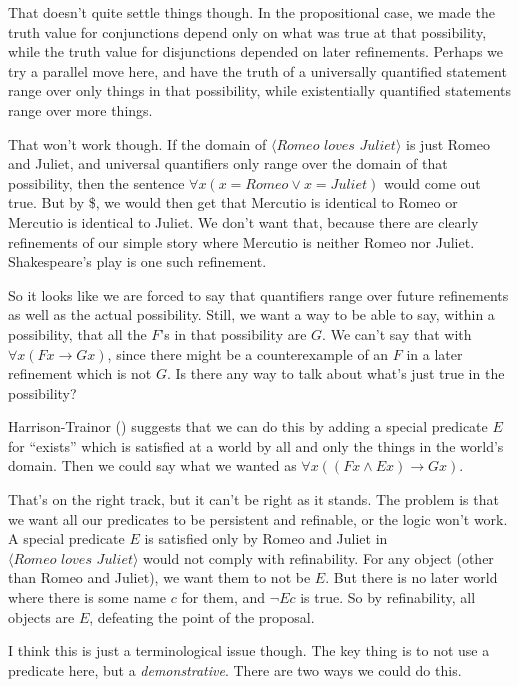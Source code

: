 \documentclass[
  11pt,
  letterpaper,
  DIV=11,
  numbers=noendperiod,
  twoside]{scrartcl}
\begin{document}
That doesn't quite settle things though. In the propositional case, we
made the truth value for conjunctions depend only on what was true at
that possibility, while the truth value for disjunctions depended on
later refinements. Perhaps we try a parallel move here, and have the
truth of a universally quantified statement range over only things in
that possibility, while existentially quantified statements range over
more things.

That won't work though. If the domain of
\(\langle \textit{Romeo loves Juliet}\rangle\) is just Romeo and Juliet,
and universal quantifiers only range over the domain of that
possibility, then the sentence
\(\forall x(x = \mathit{Romeo} \vee x = \mathit{Juliet})\) would come
out true. But by \$\forall{}, we would then get that
Mercutio is identical to Romeo or Mercutio is identical to Juliet. We
don't want that, because there are clearly refinements of our simple
story where Mercutio is neither Romeo nor Juliet. Shakespeare's play is
one such refinement.

So it looks like we are forced to say that quantifiers range over future
refinements as well as the actual possibility. Still, we want a way to
be able to say, within a possibility, that all the \(F\)'s in that
possibility are \(G\). We can't say that with
\(\forall x(Fx \rightarrow Gx)\), since there might be a counterexample
of an \(F\) in a later refinement which is not \(G\). Is there any way
to talk about what's just true in the possibility?

Harrison-Trainor () suggests
that we can do this by adding a special predicate \(E\) for ``exists''
which is satisfied at a world by all and only the things in the world's
domain. Then we could say what we wanted as
\(\forall x ((Fx \wedge Ex) \rightarrow Gx)\).

That's on the right track, but it can't be right as it stands. The
problem is that we want all our predicates to be persistent and
refinable, or the logic won't work. A special predicate \(E\) is
satisfied only by Romeo and Juliet in
\(\langle \textit{Romeo loves Juliet}\rangle\) would not comply with
refinability. For any object (other than Romeo and Juliet), we want them
to not be \(E\). But there is no later world where there is some name
\(c\) for them, and \(\neg Ec\) is true. So by refinability, all objects
are \(E\), defeating the point of the proposal.

I think this is just a terminological issue though. The key thing is to
not use a predicate here, but a \emph{demonstrative}. There are two ways
we could do this.
\end{document}
